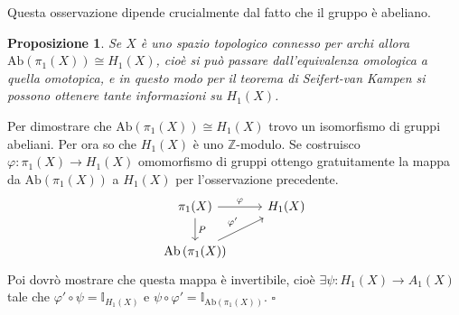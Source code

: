\documentclass[10pt, twoside=false, x11names]{scrbook}
\newtheorem{proposition}[theorem]{Proposizione}
\newenvironment{proof}{{\textbf{Dimostrazione}:}}{\hfill $\square$}
\newcommand{\Z}{\mathbb{Z}}
\renewcommand{\phi}{\varphi}
\newcommand{\Id}[1][]{\mathbb{I}_#1}
\newcommand{\Ab}[1]{\mathrm{Ab}\left( #1 \right)}
\begin{document}
Questa osservazione dipende crucialmente dal fatto che il gruppo è abeliano.

\begin{proposition}
  Se $ X $ è uno spazio topologico connesso per archi allora $ \Ab{\pi_1(X)} \cong H_1(X) $,
  cioè si può passare dall'equivalenza omologica a quella omotopica, e
  in questo modo per il teorema di Seifert-van Kampen si possono ottenere tante
  informazioni su $ H_1(X) $.
\end{proposition}

\begin{proof}
  Per dimostrare che $ \Ab{\pi_1(X)} \cong H_1(X) $ trovo un isomorfismo di
  gruppi abeliani.
  Per ora so che $ H_1(X) $ è uno $ \Z $-modulo. Se costruisco $ \phi \colon \pi_1(X) \to H_1(X) $
  omomorfismo di gruppi ottengo
  gratuitamente la mappa da $ \Ab{\pi_1(X)} $ a $ H_1(X) $ per l'osservazione precedente.
  \[
    \begin{tikzcd}
      \pi_1(X) \arrow{r}{\phi} \arrow{d}{P} & H_1(X) \\
      \Ab{\pi_1(X)} \arrow{ur}{\phi'}
    \end{tikzcd}
  \]
  Poi dovrò mostrare che questa mappa è invertibile, cioè $ \exists \psi:H_1(X) \to A_1(X) $ tale che $ \phi' \circ \psi = \Id{H_1(X)} $ e
  $ \psi \circ \phi' = \Id{\Ab{\pi_1(X)}} $.
\end{proof}
\end{document}
